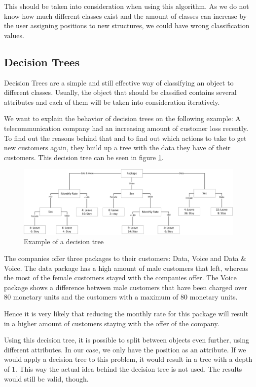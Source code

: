 This should be taken into consideration when using this algorithm. As we do not know how much different classes exist and the amount of classes can increase by the user assigning positions to new structures, we could have wrong classification values.

\subsection{Decision Trees}
\label{sec4.2.2}
Decision Trees are a simple and still effective way of classifying an object to different classes. Usually, the object that should be classified contains several attributes and each of them will be taken into consideration iteratively.

We want to explain the behavior of decision trees on the following example: 
A telecommunication company had an increasing amount of customer loss recently. To find out the reasons behind that and to find out which actions to take to get new customers again, they build up a tree with the data they have of their customers. This decision tree can be seen in figure \ref{decisionTreeExample}.

\begin{figure}[ht!]
\centering
\includegraphics[width=\textwidth]{Images/ML/DecisionTreeExample.jpg}
\caption{Example of a decision tree \label{decisionTreeExample}}
\end{figure}

The companies offer three packages to their customers: Data, Voice and Data \& Voice. The data package has a high amount of male customers that left, whereas the most of the female customers stayed with the companies offer. The Voice package shows a difference between male customers that have been charged over 80 monetary units and the customers with a maximum of 80 monetary units.

Hence it is very likely that reducing the monthly rate for this package will result in a higher amount of customers staying with the offer of the company.

Using this decision tree, it is possible to split between objects even further, using different attributes. In our case, we only have the position as an attribute. If we would apply a decision tree to this problem, it would result in a tree with a depth of 1. This way the actual idea behind the decision tree is not used. The results would still be valid, though.


